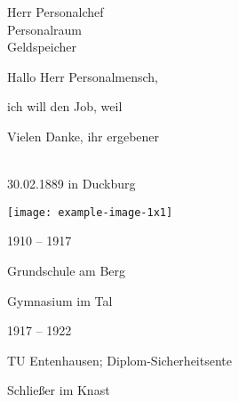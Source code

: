 \documentclass[ngerman]{scrartcl}[2014/12/17]
\begin{document}
 
\begin{letter}{Herr Personalchef\\Personalraum\\Geldspeicher} 
\opening{Hallo Herr Personalmensch,} 
ich will den Job, weil \blindtext 


\closing{Vielen Danke, ihr ergebener} 
\end{letter} 
\noindent\parbox{.5\textwidth}{%
\raggedright 
{}\\ 
30.02.1889 in Duckburg 
}\parbox{.5\textwidth}{\hfill%
\texttt{[image: example-image-1x1]}} 
\begin{labeling}[:]{1910 -- 1917} 
\item [1901 -- 1908] Grundschule am Berg 
\item [1910 -- 1917] Gymnasium im Tal 
\end{labeling} 
\begin{labeling}{1917 -- 1922} 
\item [1917 -- 1922] TU Entenhausen; Diplom-Sicherheitsente 
\item [1922 -- 1940] Schlie\ss er im Knast 
\end{labeling} 
\end{document}
